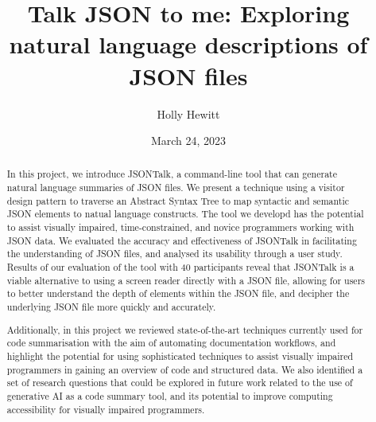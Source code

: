 \documentclass{l4proj}
\begin{document}
\title{Talk JSON to me: Exploring natural language descriptions of JSON files}
\author{Holly Hewitt}
\date{March 24, 2023}

\maketitle

\begin{abstract}

In this project, we introduce JSONTalk, a command-line tool that can generate natural language summaries of JSON files. We present a technique using a visitor design pattern to traverse an Abstract Syntax Tree to map syntactic and semantic JSON elements to natual language constructs. The tool we developd has the potential to assist visually impaired, time-constrained, and novice programmers working with JSON data. We evaluated the accuracy and effectiveness of JSONTalk in facilitating the understanding of JSON files, and analysed its usability through a user study. Results of our evaluation of the tool with 40 participants reveal that JSONTalk is a viable alternative to using a screen reader directly with a JSON file, allowing for users to better understand the depth of elements within the JSON file, and decipher the underlying JSON file more quickly and accurately.

Additionally, in this project we reviewed state-of-the-art techniques currently used for code summarisation with the aim of automating documentation workflows, and highlight the potential for using sophisticated techniques to assist visually impaired programmers in gaining an overview of code and structured data. We also identified a set of research questions that could be explored in future work related to the use of generative AI as a code summary tool, and its potential to improve computing accessibility for visually impaired programmers.

\end{abstract}


%
%
\def\consentname {Holly Hewitt} %
\def\consentdate {23 February 2023} %
%
\educationalconsent
\end{document}
